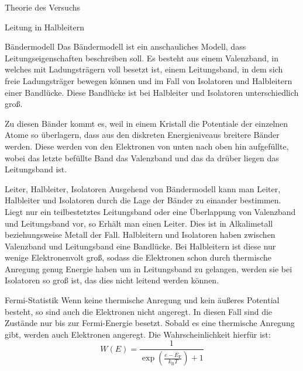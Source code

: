 \documentclass[pdftex, a4paper,11pt, twoside, ngerman]{report}
\begin{document}
  \begin{chapter}{Theorie des Versuchs}
    \label{chp:Theorie}
   
    \begin{section}{Leitung in Halbleitern}
        \begin{subsection}{Bändermodell}
            Das Bändermodell ist ein anschauliches Modell, dass Leitungseigenschaften beschreiben soll. 
            Es besteht aus einem Valenzband, in welches mit Ladungsträgern voll besetzt ist, einem Leitungsband, in dem sich freie Ladungsträger bewegen können und im Fall von Isolatoren und Halbleitern einer Bandlücke.
            Diese Bandlücke ist bei Halbleiter und Isolatoren unterschiedlich groß.

            Zu diesen Bänder kommt es, weil in einem Kristall die Potentiale der einzelnen Atome so überlagern, dass aus den diskreten Energieniveaus breitere Bänder werden.
            Diese werden von den Elektronen von unten nach oben hin aufgefüllte, wobei das letzte befüllte Band das Valenzband und das da drüber liegen das Leitungsband ist.

        \end{subsection}

        \begin{subsection}{Leiter, Halbleiter, Isolatoren}
            Ausgehend von Bändermodell kann man Leiter, Halbleiter und Isolatoren durch die Lage der Bänder zu einander bestimmen.
            Liegt nur ein teilbestetztes Leitungsband oder eine Überlappung von Valenzband und Leitungsband vor, so Erhält man einen Leiter.
            Dies ist in Alkalimetall beziehungsweise Metall der Fall.
            Halbleitern und Isolatoren haben zwischen Valenzband und Leitungsband eine Bandlücke. 
            Bei Halbleitern ist diese nur wenige Elektronenvolt groß, sodass die Elektronen schon durch thermische Anregung genug Energie haben um in Leitungsband zu gelangen, werden sie bei Isolatoren so groß ist, das dies nicht leitend werden können.

        \end{subsection}

        \begin{subsection}{Fermi-Statistik}
            Wenn keine thermische Anregung und kein äußeres Potential besteht, so sind auch die Elektronen nicht angeregt.
            In diesen Fall sind die Zustände nur bis zur Fermi-Energie besetzt.
            Sobald es eine thermische Anregung gibt, werden auch Elektronen angeregt. Die Wahrscheinlichkeit hierfür ist:
            \[
                W(E) = \frac{1}{\exp({\frac{e-E_\text{F}}{k_\text{B}T}})+1}
            \]


\end{subsection}
\end{section}
\end{chapter}
\end{document}
